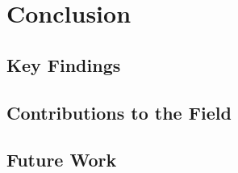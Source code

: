 %
\chapter{Conclusion}
\label{sec:conclusion}

\section{Key Findings}
\label{sec:conclusion:findings}

\section{Contributions to the Field}
\label{sec:conclusion:contributions}

\section{Future Work}
\label{sec:conclusion:future}

